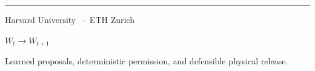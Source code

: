 {%
\begin{titlepage}\thispagestyle{empty}%
  \raggedright
  \vspace*{0.6in}
  {\textcolor{harvardcrimson}{\rule{2.2in}{1.2pt}}\par}
  \vspace{0.25in}
  {\sffamily\bfseries\fontsize{22}{26}\selectfont\color{structural}\@title\par}
  \vspace{0.08in}
  {\sffamily\fontsize{11}{15}\selectfont\color{consequence}\@subtitle\par}
  \vspace{0.55in}
  {\sffamily\large\bfseries\color{structural}\@author\par}
  \vspace{0.04in}
  {\sffamily\small\color{softink}Harvard University \ $\cdot$\  ETH Zurich\par}
  \vspace{0.18in}
  {\sffamily\footnotesize\color{paleink}\@date\par}
  \vfill
  {\sffamily\small\bfseries\color{consequence}$W_t \longrightarrow W_{t+1}$\par}
  \vspace{0.08in}
  {\sffamily\scriptsize\color{softink}%
   Learned proposals, deterministic permission, and defensible physical release.\par}
  \vspace{0.35in}
\end{titlepage}%

}
\makeatother
